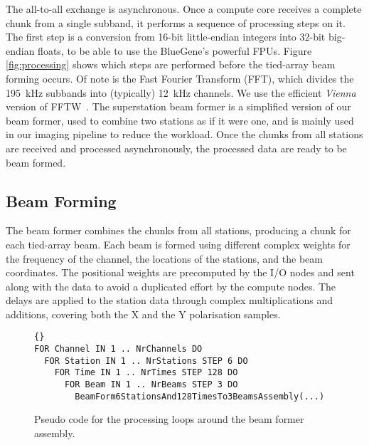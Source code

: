 \documentclass{llncs}
\begin{document}
The all-to-all exchange is asynchronous. Once a compute core receives a complete chunk from a single subband, it performs a sequence of processing steps on it. The first step is a conversion from 16-bit little-endian integers into 32-bit big-endian floats, to be able to use the BlueGene's powerful FPUs. Figure \ref{fig:processing} shows which steps are performed before the tied-array beam forming occurs. Of note is the Fast Fourier Transform (FFT), which divides  the 195~kHz subbands into (typically) 12~kHz channels. We use the efficient \emph{Vienna} version of FFTW~\cite{Lorenz:05}. The superstation beam former is a simplified version of our beam former, used to combine two stations as if it were one, and is mainly used in our imaging pipeline to reduce the workload. Once the chunks from all stations are received and processed asynchronously, the processed data are ready to be beam formed.

\subsection{Beam Forming}

The beam former combines the chunks from all stations, producing a chunk for each tied-array beam. Each beam is formed using different complex weights for the frequency of the channel, the locations of the stations, and the beam coordinates. The positional weights are precomputed by the I/O nodes and sent along with the data to avoid a duplicated effort by the compute nodes. The delays are applied to the station data through complex multiplications and additions, covering both the X and the Y polarisation samples.


\begin{figure}
\lstset{language=pseudo}
\begin{lstlisting}{}
FOR Channel IN 1 .. NrChannels DO
  FOR Station IN 1 .. NrStations STEP 6 DO
    FOR Time IN 1 .. NrTimes STEP 128 DO
      FOR Beam IN 1 .. NrBeams STEP 3 DO
        BeamForm6StationsAnd128TimesTo3BeamsAssembly(...)
\end{lstlisting}
\caption{Pseudo code for the processing loops around the beam former assembly.}
\label{lst:beam-forming}
\end{figure}        
\end{document}
